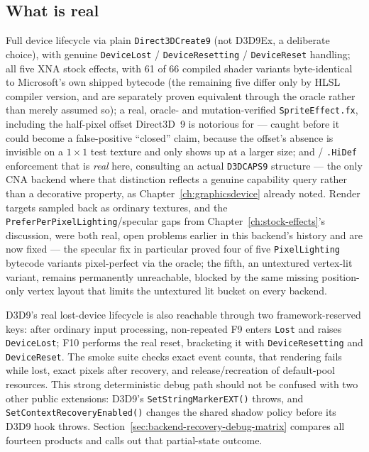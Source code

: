 \subsection{What is real}

Full device lifecycle via plain \texttt{Direct3DCreate9} (not D3D9Ex, a deliberate choice),
with genuine \texttt{DeviceLost} / \texttt{DeviceResetting} / \texttt{DeviceReset} handling; all
five XNA stock effects, with 61 of 66 compiled shader variants byte-identical to Microsoft's
own shipped bytecode (the remaining five differ only by HLSL compiler version, and are
separately proven equivalent through the oracle rather than merely assumed so); a real,
oracle- and mutation-verified \texttt{SpriteEffect.fx}, including the half-pixel offset
Direct3D~9 is notorious for --- caught before it could become a false-positive ``closed''
claim, because the offset's absence is invisible on a $1\times1$ test texture and only shows
up at a larger size; and  / \texttt{.HiDef} enforcement that is
\emph{real} here, consulting an actual \texttt{D3DCAPS9} structure --- the only CNA backend
where that distinction reflects a genuine capability query rather than a decorative property,
as Chapter~\ref{ch:graphicsdevice} already noted. Render targets sampled back as ordinary
textures, and the \texttt{PreferPerPixelLighting}/specular gaps from
Chapter~\ref{ch:stock-effects}'s  discussion, were both real, open
problems earlier in this backend's history and are now fixed --- the specular fix in
particular proved four of five \texttt{PixelLighting} bytecode variants pixel-perfect via the
oracle; the fifth, an untextured vertex-lit variant, remains permanently unreachable, blocked
by the same missing position-only vertex layout that limits the untextured lit bucket on
every backend.

\begin{sourcenote}
D3D9's real lost-device lifecycle is also reachable through two framework-reserved keys:
after ordinary input processing, non-repeated F9 enters \texttt{Lost} and raises
\texttt{DeviceLost}; F10 performs the real reset, bracketing it with
\texttt{DeviceResetting} and \texttt{DeviceReset}. The smoke suite checks exact event counts,
that rendering fails while lost, exact pixels after recovery, and release/recreation of
default-pool resources. This strong deterministic debug path should not be confused with two
other public extensions: D3D9's \texttt{SetStringMarkerEXT()} throws, and
\texttt{SetContextRecoveryEnabled()} changes the shared  shadow policy
before its D3D9 hook throws. Section~\ref{sec:backend-recovery-debug-matrix} compares all
fourteen products and calls out that partial-state outcome.
\end{sourcenote}

